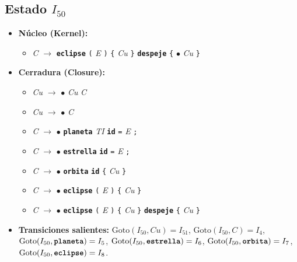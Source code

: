 \documentclass[12pt, letterpaper]{article}
\begin{document}
\subsection*{Estado $I_{50}$ }
\begin{itemize}\setlength{\itemsep}{1pt}\setlength{\parskip}{0pt}
\item \textbf{Núcleo (Kernel):}
\begin{itemize}\setlength{\itemsep}{1pt}\setlength{\parskip}{0pt}
    \item \textit{C} $\to$ \textbf{\texttt{eclipse}} \texttt{(} \textit{E} \texttt{)} \texttt{\{} \textit{Cu} \texttt{\}} \textbf{\texttt{despeje}} \texttt{\{} $\bullet$ \textit{Cu} \texttt{\}}
\end{itemize}
\item \textbf{Cerradura (Closure):}
\begin{itemize}\setlength{\itemsep}{1pt}\setlength{\parskip}{0pt}
    \item \textit{Cu} $\to$ $\bullet$ \textit{Cu} \textit{C}
    \item \textit{Cu} $\to$ $\bullet$ \textit{C}
    \item \textit{C} $\to$ $\bullet$ \textbf{\texttt{planeta}} \textit{TI} \textbf{\texttt{id}} \texttt{=} \textit{E} \texttt{;}
    \item \textit{C} $\to$ $\bullet$ \textbf{\texttt{estrella}} \textbf{\texttt{id}} \texttt{=} \textit{E} \texttt{;}
    \item \textit{C} $\to$ $\bullet$ \textbf{\texttt{orbita}} \textbf{\texttt{id}} \texttt{\{} \textit{Cu} \texttt{\}}
    \item \textit{C} $\to$ $\bullet$ \textbf{\texttt{eclipse}} \texttt{(} \textit{E} \texttt{)} \texttt{\{} \textit{Cu} \texttt{\}}
    \item \textit{C} $\to$ $\bullet$ \textbf{\texttt{eclipse}} \texttt{(} \textit{E} \texttt{)} \texttt{\{} \textit{Cu} \texttt{\}} \textbf{\texttt{despeje}} \texttt{\{} \textit{Cu} \texttt{\}}
\end{itemize}
\item \textbf{Transiciones salientes:} $\text{Goto}(I_{50}, \textit{Cu}) = I_{51}$, \quad $\text{Goto}(I_{50}, \textit{C}) = I_{4}$, \quad $\text{Goto}(I_{50}, \textbf{\texttt{planeta}}) = I_{5}$, \quad $\text{Goto}(I_{50}, \textbf{\texttt{estrella}}) = I_{6}$, \quad $\text{Goto}(I_{50}, \textbf{\texttt{orbita}}) = I_{7}$, \quad $\text{Goto}(I_{50}, \textbf{\texttt{eclipse}}) = I_{8}$.
\end{itemize}
\vspace{2pt}
\end{document}
